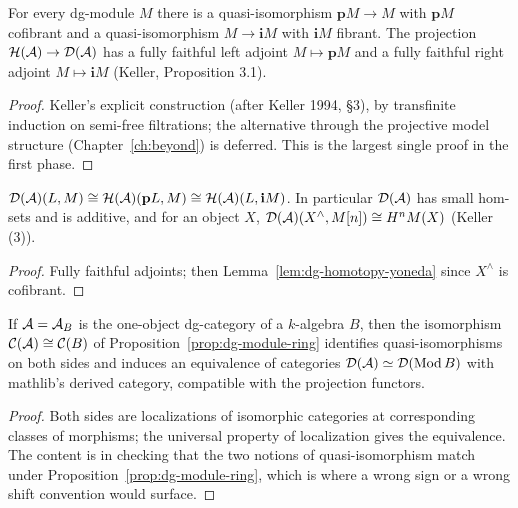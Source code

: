 \begin{proposition}[Resolutions]
\label{prop:resolutions}
For every dg-module $M$ there is a quasi-isomorphism $\mathbf{p}M \to M$ with
$\mathbf{p}M$ cofibrant and a quasi-isomorphism $M \to \mathbf{i}M$ with $\mathbf{i}M$
fibrant. The projection $\mathcal{H}(\mathcal{A}) \to \mathcal{D}(\mathcal{A})$ has a fully faithful left adjoint
$M \mapsto \mathbf{p}M$ and a fully faithful right adjoint $M \mapsto \mathbf{i}M$
(Keller, Proposition 3.1).
\end{proposition}
\begin{proof}
Keller's explicit construction (after Keller 1994, \S 3), by transfinite induction on
semi-free filtrations; the alternative through the projective model structure
(Chapter~\ref{ch:beyond}) is deferred. This is the largest single proof in the first phase.
\end{proof}

\begin{corollary}
\label{cor:derived-homs}
$\mathcal{D}(\mathcal{A})(L,M) \cong \mathcal{H}(\mathcal{A})(\mathbf{p}L, M) \cong \mathcal{H}(\mathcal{A})(L, \mathbf{i}M)$.
In particular $\mathcal{D}(\mathcal{A})$ has small hom-sets and is additive, and for an object $X$,
$\mathcal{D}(\mathcal{A})(X^{\wedge}, M[n]) \cong H^n M(X)$ (Keller (3)).
\end{corollary}
\begin{proof}
Fully faithful adjoints; then Lemma~\ref{lem:dg-homotopy-yoneda} since $X^{\wedge}$ is
cofibrant.
\end{proof}

\begin{theorem}
\label{thm:ring-comparison}
If $\mathcal{A} = \mathcal{A}_B$ is the one-object dg-category of a $k$-algebra $B$, then the isomorphism
$\mathcal{C}(\mathcal{A}) \cong \mathcal{C}(B)$ of Proposition~\ref{prop:dg-module-ring} identifies
quasi-isomorphisms on both sides and induces an equivalence of categories
$\mathcal{D}(\mathcal{A}) \simeq \mathcal{D}(\operatorname{Mod} B)$ with mathlib's derived category, compatible with the
projection functors.
\end{theorem}
\begin{proof}
Both sides are localizations of isomorphic categories at corresponding classes of
morphisms; the universal property of localization gives the equivalence. The content is in
checking that the two notions of quasi-isomorphism match under
Proposition~\ref{prop:dg-module-ring}, which is where a wrong sign or a wrong shift
convention would surface.
\end{proof}


